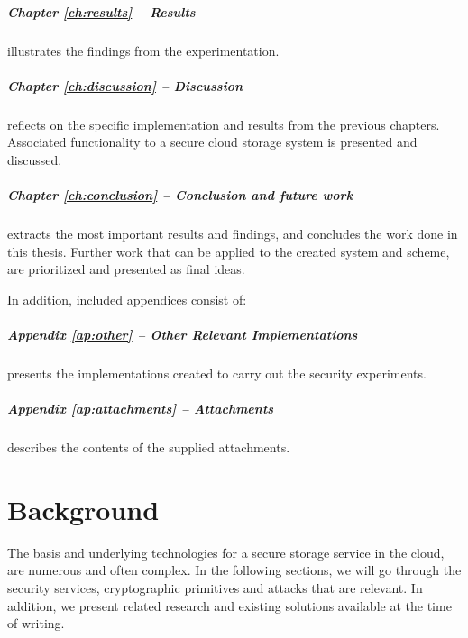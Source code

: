 \documentclass[pdftex,english,10pt,b5paper,twoside]{book}
\begin{document}
\paragraph{Chapter \ref{ch:results} -- Results} illustrates the findings from
the experimentation.

\paragraph{Chapter \ref{ch:discussion} -- Discussion} reflects on the specific
implementation and results from the previous chapters. Associated functionality
to a secure cloud storage system is presented and discussed.

\paragraph{Chapter \ref{ch:conclusion} -- Conclusion and future work} extracts
the most important results and findings, and concludes the work done in this
thesis.  Further work that can be applied to the created system and scheme, are
prioritized and presented as final ideas.

\bigskip

\noindent In addition, included appendices consist of:

\paragraph{Appendix \ref{ap:other} -- Other Relevant Implementations}
presents the implementations created to carry out the security experiments.

\paragraph{Appendix \ref{ap:attachments} -- Attachments} describes the contents
of the supplied attachments.

\chapter{Background}
\label{ch:background}

The basis and underlying technologies for a secure storage service in the
cloud, are numerous and often complex. In the following sections, we will go
through the security services, cryptographic primitives and attacks that are
relevant. In addition, we present related research and existing solutions
available at the time of writing.
\end{document}
